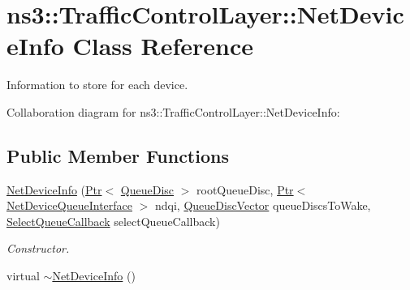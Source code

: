 \hypertarget{classns3_1_1TrafficControlLayer_1_1NetDeviceInfo}{}\section{ns3\+:\+:Traffic\+Control\+Layer\+:\+:Net\+Device\+Info Class Reference}
\label{classns3_1_1TrafficControlLayer_1_1NetDeviceInfo}


Information to store for each device.  




Collaboration diagram for ns3\+:\+:Traffic\+Control\+Layer\+:\+:Net\+Device\+Info\+:
\subsection*{Public Member Functions}
\begin{DoxyCompactItemize}
\item 
\hyperlink{classns3_1_1TrafficControlLayer_1_1NetDeviceInfo_a9811a555a45f5c89c9caca8e2dacafdf}{Net\+Device\+Info} (\hyperlink{classns3_1_1Ptr}{Ptr}$<$ \hyperlink{classns3_1_1QueueDisc}{Queue\+Disc} $>$ root\+Queue\+Disc, \hyperlink{classns3_1_1Ptr}{Ptr}$<$ \hyperlink{classns3_1_1NetDeviceQueueInterface}{Net\+Device\+Queue\+Interface} $>$ ndqi, \hyperlink{classns3_1_1TrafficControlLayer_a9c468db4727d64733d7dba66d2791edf}{Queue\+Disc\+Vector} queue\+Discs\+To\+Wake, \hyperlink{classns3_1_1TrafficControlLayer_aac192f903f140af92ca59a2d91a4c0cb}{Select\+Queue\+Callback} select\+Queue\+Callback)
\begin{DoxyCompactList}\small\item\em Constructor. \end{DoxyCompactList}\item 
virtual \hyperlink{classns3_1_1TrafficControlLayer_1_1NetDeviceInfo_a7c52f1b074dd4ee44de487942f0e00c9}{$\sim$\+Net\+Device\+Info} ()
\end{DoxyCompactItemize}
